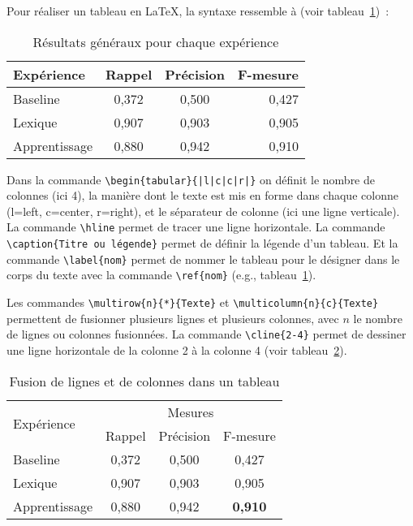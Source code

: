 \documentclass{report}
\begin{document}
Pour réaliser un  tableau en \LaTeX{}, la syntaxe
ressemble à (voir tableau~\ref{tab:exemple})~:
%
\begin{table}[h]
  \centering
  \begin{tabular}{|l|c|c|r|} \hline
    Expérience & Rappel & Précision & F-mesure \\ \hline
    Baseline & 0,372 & 0,500 & 0,427 \\
    Lexique & 0,907 & 0,903 & 0,905 \\
    Apprentissage & 0,880 & 0,942 & 0,910 \\ \hline
  \end{tabular}
  \caption{Résultats généraux pour chaque expérience}
  \label{tab:exemple}
\end{table}

Dans la commande \verb+\begin{tabular}{|l|c|c|r|}+ on définit le
  nombre de colonnes (ici 4), la manière dont le texte est mis en
  forme dans chaque colonne (l=left, c=center, r=right), et le
  séparateur de colonne (ici une ligne verticale). La commande
  \verb+\hline+ permet de tracer une ligne horizontale. La commande
  \verb+\caption{Titre ou légende}+ permet de définir la légende d'un
  tableau. Et la commande \verb+\label{nom}+ permet de nommer le
  tableau pour le désigner dans le corps du texte avec la commande
  \verb+\ref{nom}+ (e.g., tableau~\ref{tab:exemple}).

Les commandes \verb+\multirow{n}{*}{Texte}+ et
\verb+\multicolumn{n}{c}{Texte}+ permettent de fusionner plusieurs
lignes et plusieurs colonnes, avec $n$ le nombre de lignes ou colonnes
fusionnées. La commande \verb+\cline{2-4}+ permet de dessiner une
ligne horizontale de la colonne 2 à la colonne 4 (voir tableau~\ref{tab:autre}).
%
\begin{table}[h]
  \centering
  \begin{tabular}{|l|ccc|} \hline
    \multirow{2}{*}{Expérience} & \multicolumn{3}{c|}{Mesures} \\ \cline{2-4}
    & Rappel & Précision & F-mesure \\ \hline
    Baseline & 0,372 & 0,500 & 0,427 \\
    Lexique & 0,907 & 0,903 & 0,905 \\
    Apprentissage & 0,880 & 0,942 & \textbf{0,910} \\ \hline
  \end{tabular}
  \caption{Fusion de lignes et de colonnes dans un tableau}
  \label{tab:autre}
\end{table}
\end{document}
